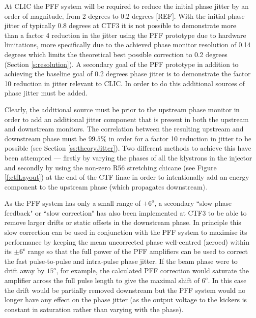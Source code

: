 At CLIC the PFF system will be required to reduce the initial phase jitter by an order of magnitude, from 2 degrees to 0.2 degrees [REF]. With the initial phase jitter of typically 0.8 degrees at CTF3 it is not possible to demonstrate more than a factor 4 reduction in the jitter using the PFF prototype due to hardware limitations, more specifically due to the achieved phase monitor resolution of 0.14 degrees which limits the theoretical best possible correction to 0.2 degrees (Section \ref{s:resolution}). A secondary goal of the PFF prototype in addition to achieving the baseline goal of 0.2 degrees phase jitter is to demonstrate the factor 10 reduction in jitter relevant to CLIC. In order to do this additional sources of phase jitter must be added.

Clearly, the additional source must be prior to the upstream phase monitor in order to add an additional jitter component that is present in both the upstream and downstream monitors. The correlation between the resulting upstream and downstream phase must be  \(99.5\%\) in order for a factor 10 reduction in jitter to be possible (see Section \ref{ss:theoryJitter}). Two different methods to achieve this have been attempted --- firstly by varying the phases of all the klystrons in the injector and secondly by using the non-zero R56 stretching chicane (see Figure \ref{f:ctfLayout}) at the end of the CTF linac in order to intentionally add an energy component to the upstream phase (which propagates downstream).


As the PFF system has only a small range of \(\pm6^{o}\), a secondary ``slow phase feedback" or ``slow correction" has also been implemented at CTF3 to be able to remove larger drifts or static offsets in the downstream phase. In principle this slow correction can be used in conjunction with the PFF system to maximise its performance by keeping the mean uncorrected phase well-centred (zeroed) within its \(\pm6^{o}\) range so that the full power of the PFF amplifiers can be used to correct the fast pulse-to-pulse and intra-pulse phase jitter. If the beam phase were to drift away by \(15^{o}\), for example, the calculated PFF correction would saturate the amplifier across the full pulse length to give the maximal shift of \(6^{o}\). In this case the drift would be partially removed downstream but the PFF system would no longer have any effect on the phase jitter (as the output voltage to the kickers is constant in saturation rather than varying with the phase).

